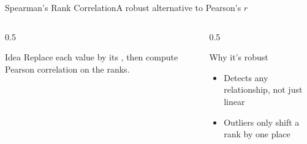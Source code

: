 \documentclass[aspectratio=169,11pt]{beamer}
\begin{document}
\begin{frame}{Spearman's Rank Correlation}{A robust alternative to Pearson's $r$}
  \begin{columns}[T]
    \begin{column}{0.5\textwidth}
      \begin{block}{Idea}
        \small Replace each value by its , then compute
        Pearson correlation on the ranks.
      \end{block}
    \end{column}
    \begin{column}{0.5\textwidth}
      \begin{exampleblock}{Why it's robust}
        \small
        \begin{itemize}
          \item Detects any  relationship, not just linear
          \item Outliers only shift a rank by one place
        \end{itemize}
      \end{exampleblock}
    \end{column}
  \end{columns}
\end{frame}
\end{document}

